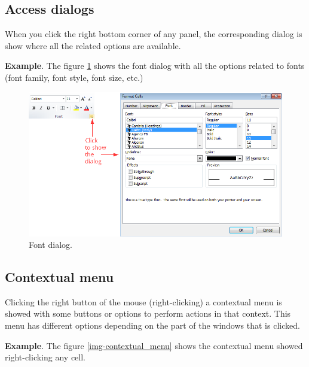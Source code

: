 \subsection{Access dialogs}\hypertarget{access-dialogs}{}\label{access-dialogs}

When you click the right bottom corner of any panel, the corresponding dialog is show where all the related options are available.

\textbf{Example}. The figure \ref{img-access_font_dialog} shows the font dialog with all the options related to fonts (font family,
font style, font size, etc.)

\begin{figure}[htbp]
\begin{center}
\includegraphics[max width=\linewidth]{../img/access_font_dialog.png}
\end{center}
\caption{Font dialog.}
\label{img-access_font_dialog}
\end{figure}

\subsection{Contextual menu}\hypertarget{contextual-menu}{}\label{contextual-menu}

Clicking the right button of the mouse (right-clicking) a contextual menu is showed with some buttons or options to perform actions in that context. 
This menu has different options depending on the part of the windows that is clicked.

\textbf{Example}. The figure \ref{img-contextual_menu} shows the contextual menu showed right-clicking any cell.


